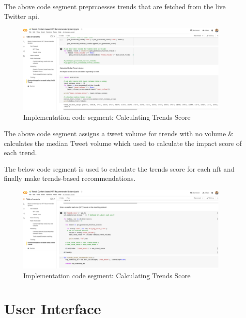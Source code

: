 The above code segment preprcoesses trends that are fetched from the live Twitter \gls{api}.

\begin{figure}[h!]
\centering
\includegraphics[width=0.95\textwidth]{images/Implementation/code/tweet-volume calculation.png}
\caption{Implementation code segment: Calculating Trends Score}
\label{fig:code-tweet-volume-extraction}
\end{figure}

The above code segment assigns a tweet volume for trends with no volume \& calculates the median Tweet volume which used to calculate the impact score of each trend.

The below code segment is used to calculate the trends score for each \gls{nft} and finally make trends-based recommendations.
\begin{figure}[h!]
\centering
\includegraphics[width=0.95\textwidth]{images/Implementation/code/calculating trends score.png}
\caption{Implementation code segment: Calculating Trends Score}
\label{fig:code-trends-score}
\end{figure}


\section{User Interface}

